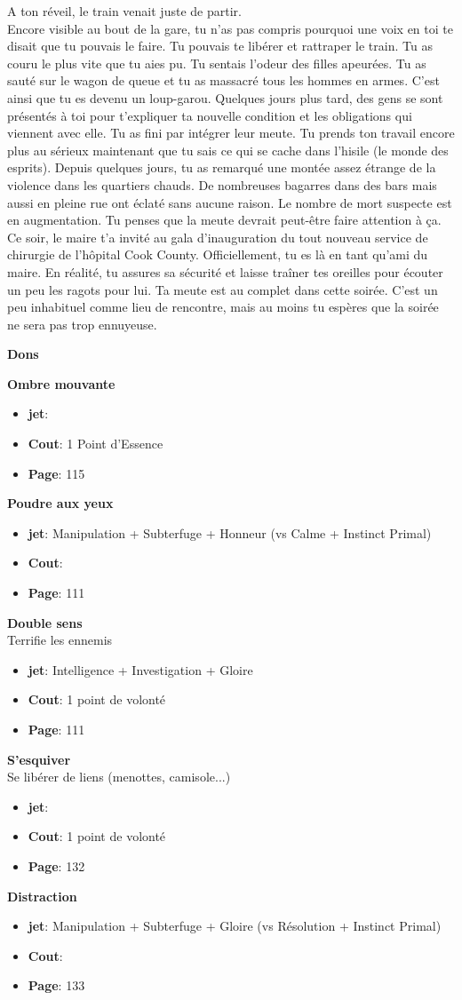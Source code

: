 \documentclass[oneside,12pt]{book}
\newcommand\don[5]{
\textbf{#1} \\
#2
\begin{itemize}
\item{ \textbf{jet}: #3}
\item{ \textbf{Cout}: #4}
\item{ \textbf{Page}: #5}
\end{itemize}
\vspace{0.5cm}
}
\begin{document}
\begin{flushleft}
\begin{description}
{A ton réveil, le train venait juste de partir.\\ 
Encore visible au bout de la gare, tu n'as pas compris pourquoi une voix en toi te disait que tu pouvais le faire. 
Tu pouvais te libérer et rattraper le train. Tu as couru le plus vite que tu aies pu. Tu sentais l'odeur des filles apeurées. 
Tu as sauté sur le wagon de queue et tu as massacré tous les hommes en armes. C'est ainsi que tu es devenu un loup-garou. 
Quelques jours plus tard, des gens se sont présentés à toi pour t'expliquer ta nouvelle condition et les obligations qui viennent avec elle.
Tu as fini par intégrer leur meute.
Tu prends ton travail encore plus au sérieux maintenant que tu sais ce qui se cache dans l'hisile (le monde des esprits).
Depuis quelques jours, tu as remarqué une montée assez étrange de la violence dans les quartiers chauds. De nombreuses bagarres dans des bars mais aussi en pleine rue ont éclaté sans aucune raison. Le nombre de mort suspecte est en augmentation. Tu penses que la meute devrait peut-être faire attention à ça.
\\
Ce soir, le maire t'a invité au gala d'inauguration du tout nouveau service de chirurgie de l'hôpital Cook County. 
Officiellement, tu es là en tant qu'ami du maire. 
En réalité, tu assures sa sécurité et laisse traîner tes oreilles pour écouter un peu les ragots pour lui. 
Ta meute est au complet dans cette soirée. 
C'est un peu inhabituel comme lieu de rencontre, mais au moins tu espères que la soirée ne sera pas trop ennuyeuse. }
\end{description}
\clearpage
\textbf{\large Dons} 
\vspace{0.5cm}


\don{Ombre mouvante}{}{}{1 Point d'Essence}{115}
\don{Poudre aux yeux}{}{Manipulation + Subterfuge + Honneur (vs Calme + Instinct Primal)}{}{111}
\don{Double sens}{Terrifie les ennemis}{Intelligence + Investigation + Gloire}{ 1 point de volonté}{111}
\don{S'esquiver}{Se libérer de liens (menottes, camisole...)}{}{1 point de volonté}{132}
\don{Distraction}{}{Manipulation + Subterfuge + Gloire (vs Résolution + Instinct Primal) }{}{133}



\clearpage

\end{flushleft}
\end{document}
